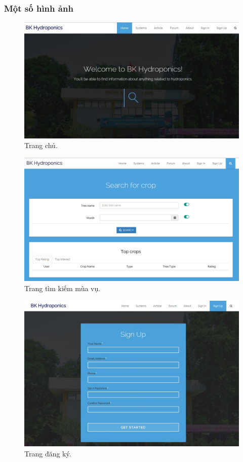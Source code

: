 \documentclass[a4paper,12pt,oneside]{article}
\begin{document}
\subsubsection{Một số hình ảnh}
\begin{center}

\begin{figure}[H]
\centering
\includegraphics[scale=.5]{hinh/web_home.jpg}
\caption{Trang chủ.}
\end{figure}

\begin{figure}[H]
\centering
\includegraphics[scale=.5]{hinh/search_page.png}
\caption{Trang tìm kiếm mùa vụ.}
\end{figure}

\begin{figure}[H]
\centering
\includegraphics[scale=.48]{hinh/web_register.jpg}
\caption{Trang đăng ký.}
\end{figure}


\end{center}
\end{document}
